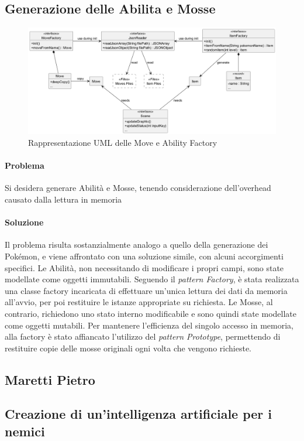 \documentclass[a4paper,12pt]{report}
\begin{document}
{{\subsection*{Generazione delle Abilita e Mosse}
\begin{figure}[H]
\centering{}
\includegraphics[width=\textwidth]{immagini/MoveAbilityFactory.png}
\caption{Rappresentazione UML delle Move e Ability Factory}
\label{immagini/MoveAbilityFactory}
\end{figure}
\paragraph{Problema} Si desidera generare Abilità e Mosse, tenendo considerazione dell'overhead causato dalla lettura in memoria
\paragraph{Soluzione} Il problema risulta sostanzialmente analogo a quello della generazione dei Pokémon, e viene affrontato con una soluzione simile, con alcuni accorgimenti specifici. Le Abilità, non necessitando di modificare i propri campi, sono state modellate come oggetti immutabili. Seguendo il \textit{pattern Factory}, è stata realizzata una classe factory incaricata di effettuare un’unica lettura dei dati da memoria all’avvio, per poi restituire le istanze appropriate su richiesta.
Le Mosse, al contrario, richiedono uno stato interno modificabile e sono quindi state modellate come oggetti mutabili. Per mantenere l’efficienza del singolo accesso in memoria, alla factory è stato affiancato l’utilizzo del \textit{pattern Prototype}, permettendo di restituire copie delle mosse originali ogni volta che vengono richieste.

\subsection{Maretti Pietro}
\subsection*{Creazione di un'intelligenza artificiale per i nemici}


}}
\end{document}
